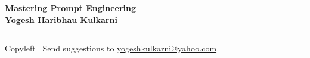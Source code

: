 
\graphicspath{{images/}}

\footnotesize


\begin{center}
\Large{\textbf{Mastering Prompt Engineering\\ Yogesh Haribhau Kulkarni}}  
\end{center}

\begin{multicols}{2}

%
\end{multicols}

\rule{\linewidth}{0.25pt}
\scriptsize
Copyleft \textcopyleft\  Send suggestions to 
\href{http://www.yogeshkulkarni.com}{yogeshkulkarni@yahoo.com}


